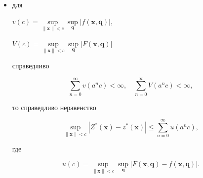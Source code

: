 \begin{theorem}
\begin{itemize}
для некоторого $0<a <1,$

\mbox{$\forall$~$\boldsymbol q\in Q$ и~$\forall$~$\boldsymbol x\in X;$}



\item[\small \rm T5)]

для 

$ v(c)=

\sup \limits_{\| \boldsymbol x \|<c }

\sup \limits_{\boldsymbol q} | f(\boldsymbol x, \boldsymbol q) |,$

$ V(c)=

\sup \limits_{\| \boldsymbol x \|<c } 

\sup \limits_{\boldsymbol q} | F(\boldsymbol x, \boldsymbol q) |$

справедливо

$$\sum\limits_{n=0}^\infty v(a^nc) <\infty,\quad \sum\limits_{n=0}^\infty V(a^nc) <\infty ,$$

то справедливо неравенство



\begin{equation}

\sup \limits_{\| \boldsymbol x \|<c} | Z^\ast (\boldsymbol x)-z^\ast (\boldsymbol x) |\leqslant 

\sum\limits_{n=0}^\infty u(a^nc), 

\end{equation}

где 

\begin{equation}

u(c)= \sup \limits_{\| \boldsymbol x\|<c } 

\sup \limits_{\boldsymbol q} | F(\boldsymbol x, \boldsymbol q)-f(\boldsymbol x, \boldsymbol q) |.  

\end{equation}

\end{itemize}

\end{theorem}







